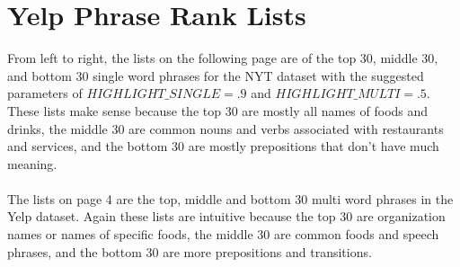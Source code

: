 \documentclass{article}
\begin{document}
\section*{Yelp Phrase Rank Lists}
From left to right, the lists on the following page are of the top 30, middle 30, and bottom 30 single word phrases for the NYT dataset with the suggested parameters of $HIGHLIGHT\_SINGLE=.9$ and $HIGHLIGHT\_MULTI=.5$.\\
These lists make sense because the top 30 are mostly all names of foods and drinks, the middle 30 are common nouns and verbs associated with restaurants and services, and the bottom 30 are mostly prepositions that don't have much meaning.\\\\
The lists on page 4 are the top, middle and bottom 30 multi word phrases in the Yelp dataset.  Again these lists are intuitive because the top 30 are organization names or names of specific foods, the middle 30 are common foods and speech phrases, and the bottom 30 are more prepositions and transitions.
\end{document}

